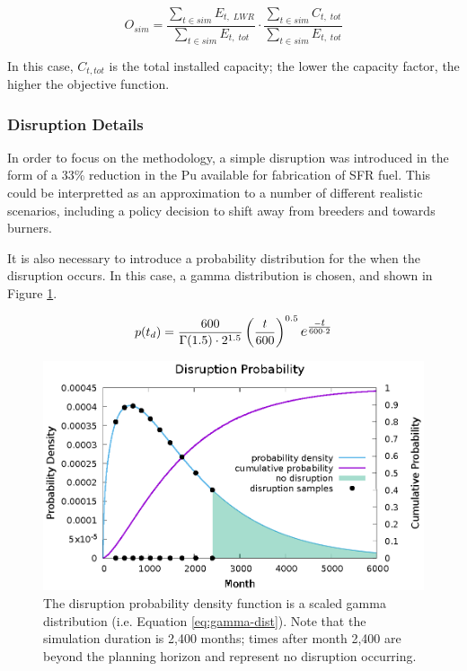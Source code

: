 \begin{equation}
    O_{sim} = \frac{\sum\limits_{t \in sim} E_{t,\;LWR}}{\sum\limits_{t \in sim} E_{t,\;tot}}
              \cdot
              \frac{\sum\limits_{t \in sim} C_{t,\;tot}}{\sum\limits_{t \in sim} E_{t,\;tot}}
    \label{eq:exp3-obj}
\end{equation}

In this case, $C_{t,tot}$ is the total installed capacity; the lower the capacity factor, the higher the objective function.

\subsubsection{Disruption Details}

In order to focus on the methodology, a simple disruption was introduced in
the form of a 33\% reduction in the Pu available for fabrication of \gls{SFR}
fuel.  This could be interpretted as an approximation to a number of different
realistic scenarios, including a policy decision to shift away from breeders
and towards burners.

It is also necessary to introduce a probability distribution for the when the
disruption occurs.  In this case, a gamma distribution is chosen, and shown in
Figure \ref{fig:exp3-gamma-dist}.

\begin{equation}
    p(t_d) = \frac{600}{\Gamma(1.5)\cdot 2^{1.5}} \left(\frac{t}{600}\right)^{0.5} \mathlarger{e^{\frac{\mathlarger{\mathsmaller{-}t}}{600 \cdot 2}}}
    \label{eq:gamma-dist}
\end{equation}

\begin{figure}[!htb]
    \centering
    \includegraphics[width=1.0\columnwidth]{gamma-dist.eps}
    \caption[Disruption Probability Distribution]{
        The disruption probability density function is a scaled gamma
        distribution (i.e. Equation \ref{eq:gamma-dist}).  Note that the
        simulation duration is 2,400 months; times after month 2,400 are
        beyond the planning horizon and represent no disruption occurring.
    }
    \label{fig:exp3-gamma-dist}
\end{figure}


